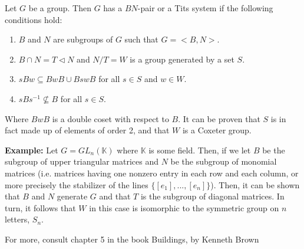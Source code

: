 \documentclass[12pt]{article}
\begin{document}
Let $G$ be a group. Then $G$ has a $BN$-pair or a Tits system if the following conditions hold:

\begin{enumerate}
\item
$B$ and $N$ are subgroups of $G$ such that $G=<B,N>$.
\item
$B\cap N =T \triangleleft N$ and $N/T=W$ is a group generated by a set $S$.
\item
$sBw \subseteq BwB \cup BswB$ for all $s\in S$ and $w\in W$.
\item
$sBs^{-1} \not\subseteq B$ for all $s\in S$.
\end{enumerate}

Where $BwB$ is a double coset with respect to $B$. It can be proven that $S$ is in fact made up of elements of order 2, and that $W$ is a Coxeter group. 

{\bf Example:} Let $G=GL_n(\mathbb{K})$ where $\mathbb{K}$ is some field. Then, if we let $B$ be the subgroup of upper triangular matrices and $N$ be the subgroup of monomial matrices (i.e. matrices having one nonzero entry in each row and each column, or more precisely the stabilizer of the lines $\{[e_1],...,[e_n]\}$). Then, it can be shown that $B$ and $N$ generate $G$ and that $T$ is the subgroup of diagonal matrices. In turn, it follows that $W$ in this case is isomorphic to the symmetric group on $n$ letters, $S_n$.

For more, consult chapter 5 in the book Buildings, by Kenneth Brown
\end{document}
